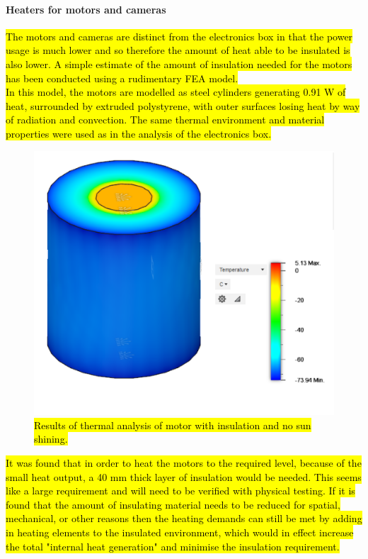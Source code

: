 \paragraph{Heaters for motors and cameras}
\hl{The motors and cameras are distinct from the electronics box in that the power usage is much lower and so therefore the amount of heat able to be insulated is also lower. A simple estimate of the amount of insulation needed for the motors has been conducted using a rudimentary FEA model.}\\

\hl{In this model, the motors are modelled as steel cylinders generating 0.91 W of heat, surrounded by extruded polystyrene, with outer surfaces losing heat by way of radiation and convection. The same thermal environment and material properties were used as in the analysis of the electronics box.}\\

	\begin{figure}[H]
    \centering
    \includegraphics[scale=0.6]{4-experiment-design/img/mechanical/thermalmotors.PNG}
	\caption{\hl{Results of thermal analysis of motor with insulation and no sun shining.}}
	\label{fig:thermalmotors}
	\end{figure}

\hl{It was found that in order to heat the motors to the required level, because of the small heat output, a 40 mm thick layer of insulation would be needed. This seems like a large requirement and will need to be verified with physical testing. If it is found that the amount of insulating material needs to be reduced for spatial, mechanical, or other reasons then the heating demands can still be met by adding in heating elements to the insulated environment, which would in effect increase the total "internal heat generation" and minimise the insulation requirement.}\\

